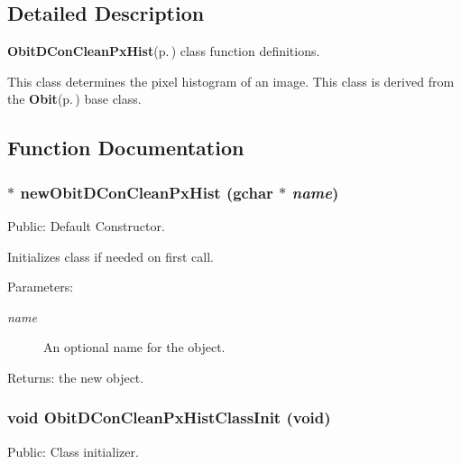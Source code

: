 \subsection{Detailed Description}
{\bf Obit\-DCon\-Clean\-Px\-Hist}{\rm (p.\,\pageref{structObitDConCleanPxHist})} class function definitions. 

This class determines the pixel histogram of an image. This class is derived from the {\bf Obit}{\rm (p.\,\pageref{structObit})} base class.

\subsection{Function Documentation}
\subsubsection{$\ast$ new\-Obit\-DCon\-Clean\-Px\-Hist (gchar $\ast$ {\em name})}\label{ObitDConCleanPxHist_8c_a7}


Public: Default Constructor. 

Initializes class if needed on first call. \begin{Desc}
\item[Parameters:]
\begin{description}
\item[{\em name}]An optional name for the object. \end{description}
\end{Desc}
\begin{Desc}
\item[Returns:]the new object. \end{Desc}
\subsubsection{\setlength{\rightskip}{0pt plus 5cm}void Obit\-DCon\-Clean\-Px\-Hist\-Class\-Init (void)}\label{ObitDConCleanPxHist_8c_a13}


Public: Class initializer. 

